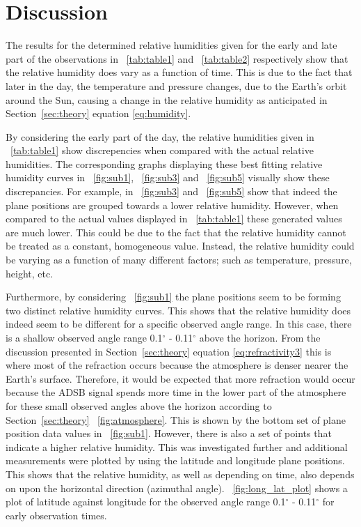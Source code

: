 \documentclass[11pt]{article}
\newcommand{\figref}[2][\figurename~]{#1\ref{#2}}
\newcommand{\tabref}[2][\tablename~]{#1\ref{#2}}
\newcommand{\secref}[2][Section~]{#1\ref{#2}}
\begin{document}
\section{Discussion}
\label{sec:discussion}

The results for the determined relative humidities given for the early and late part of the observations in \tabref{tab:table1} and \tabref{tab:table2} respectively show that the relative humidity does vary as a function of time. This is due to the fact that later in the day, the temperature and pressure changes, due to the Earth's orbit around the Sun, causing a change in the relative humidity as anticipated in \secref{sec:theory} equation \eqref{eq:humidity}.

\vspace{2mm}
\noindent
By considering the early part of the day, the relative humidities given in \tabref{tab:table1} show discrepencies when compared with the actual relative humidities. The corresponding graphs displaying these best fitting relative humidity curves in \figref{fig:sub1}, \figref{fig:sub3} and \figref{fig:sub5} visually show these discrepancies. For example, in \figref{fig:sub3} and \figref{fig:sub5} show that indeed the plane positions are grouped towards a lower relative humidity. However, when compared to the actual values displayed in \tabref{tab:table1} these generated values are much lower. This could be due to the fact that the relative humidity cannot be treated as a constant, homogeneous value. Instead, the relative humidity could be varying as a function of many different factors; such as temperature, pressure, height, etc. 

\vspace{2mm}
\noindent
Furthermore, by considering \figref{fig:sub1} the plane positions seem to be forming two distinct relative humidity curves. This shows that the relative humidity does indeed seem to be different for a specific observed angle range. In this case, there is a shallow observed angle range 0.1$^{\circ}$ - 0.11$^{\circ}$ above the horizon. From the discussion presented in \secref{sec:theory} equation \eqref{eq:refractivity3} this is where most of the refraction occurs because the atmosphere is denser nearer the Earth's surface. Therefore, it would be expected that more refraction would occur because the ADSB signal spends more time in the lower part of the atmosphere for these small observed angles above the horizon according to \secref{sec:theory} \figref{fig:atmosphere}. This is shown by the bottom set of plane position data values in \figref{fig:sub1}. However, there is also a set of points that indicate a higher relative humidity. This was investigated further and additional measurements were plotted by using the latitude and longitude plane positions. This shows that the relative humidity, as well as depending on time, also depends on upon the horizontal direction (azimuthal angle). \figref{fig:long_lat_plot} shows a plot of latitude against longitude for the observed angle range 0.1$^{\circ}$ - 0.11$^{\circ}$ for early observation times.
\end{document}
